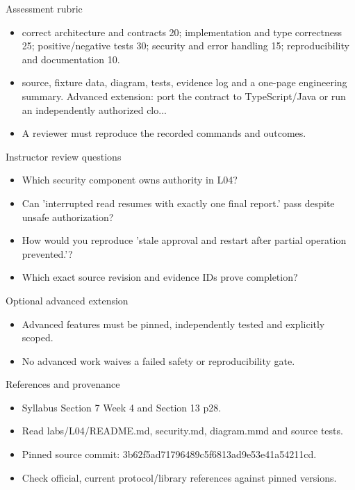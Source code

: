 \documentclass[aspectratio=169,10pt]{beamer}
\begin{document}
\begin{frame}{Assessment rubric}
\small
\begin{itemize}
\item correct architecture and contracts 20; implementation and type correctness 25; positive/negative tests 30; security and error handling 15; reproducibility and documentation 10.
\item source, fixture data, diagram, tests, evidence log and a one-page engineering summary. Advanced extension: port the contract to TypeScript/Java or run an independently authorized clo...
\item A reviewer must reproduce the recorded commands and outcomes.
\end{itemize}

\end{frame}

\begin{frame}{Instructor review questions}
\small
\begin{itemize}
\item Which security component owns authority in L04?
\item Can 'interrupted read resumes with exactly one final report.' pass despite unsafe authorization?
\item How would you reproduce 'stale approval and restart after partial operation prevented.'?
\item Which exact source revision and evidence IDs prove completion?
\end{itemize}

\end{frame}

\begin{frame}{Optional advanced extension}
\small
\begin{itemize}
\item Advanced features must be pinned, independently tested and explicitly scoped.
\item No advanced work waives a failed safety or reproducibility gate.
\end{itemize}

\end{frame}

\begin{frame}{References and provenance}
\small
\begin{itemize}
\item Syllabus Section 7 Week 4 and Section 13 p28.
\item Read labs/L04/README.md, security.md, diagram.mmd and source tests.
\item Pinned source commit: 3b62f5ad71796489c5f6813ad9e53e41a54211cd.
\item Check official, current protocol/library references against pinned versions.
\end{itemize}

\end{frame}
\end{document}
